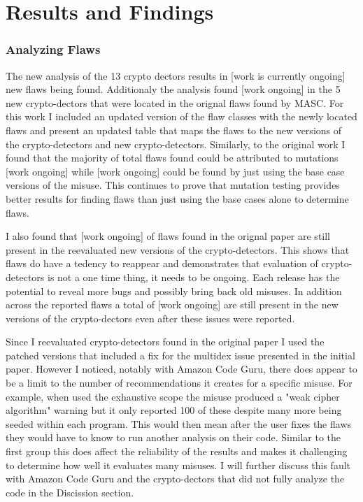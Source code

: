 \chapter{Results and Findings}
\label{chap_results}

\subsection{Analyzing Flaws}
\label{ch5:sec:flaws}

\begin{sloppypar}


\end{sloppypar}


The new analysis of the 13 crypto dectors results in [work is currently ongoing] new flaws being found. Additionaly the analysis found [work ongoing] in the 5 new crypto-dectors that were located in the orignal flaws found by MASC. For this work I included an updated version of the flaw classes with the newly located flaws and present an updated table that maps the flaws to the new versions of the crypto-detectors and new crypto-detectors. Similarly, to the original work I found that the majority of total flaws found could be attributed to mutations [work ongoing] while [work ongoing] could be found by just using the base case versions of the misuse. This continues to prove that mutation testing provides better results for finding flaws than just using the base cases alone to determine flaws.

I also found that [work ongoing] of flaws found in the orignal paper are still present in the reevaluated new versions of the crypto-detectors. This shows that flaws do have a tedency to reappear and demonstrates that evaluation of crypto-detectors is not a one time thing, it needs to be ongoing. Each release has the potential to reveal more bugs and possibly bring back old misuses. In addition across the reported flaws a total of [work ongoing] are still present in the new versions of the crypto-dectors even after these issues were reported.

Since I reevaluated crypto-detectors found in the original paper I used the patched versions that included a fix for the multidex issue presented in the initial paper. However I noticed, notably with Amazon Code Guru, there does appear to be a limit to the number of recommendations it creates for a specific misuse. For example, when used the exhaustive scope the misuse produced a "weak cipher algorithm" warning but it only reported 100 of these despite many more being seeded within each program. This would then mean after the user fixes the flaws they would have to know to run another analysis on their code. Similar to the first group this does affect the reliability of the results and makes it challenging to determine how well it evaluates many misuses. I will further discuss this fault with Amazon Code Guru and the crypto-dectors that did not fully analyze the code in the Discission section. 

